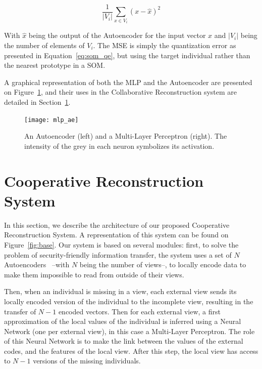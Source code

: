 		\begin{equation}
            \frac{1}{|V_i|}\sum_{x \in V_i}{(x - \hat{x})}^2
		\end{equation}
		
        With $\hat{x}$ being the output of the Autoencoder for the input vector $x$ and $|V_i|$ being the number of elements of $V_i$. The MSE is simply the quantization error as presented in Equation~\ref{eq:som_qe}, but using the target individual rather than the nearest prototype in a SOM.\@

    A graphical representation of both the MLP and the Autoencoder are presented on Figure~\ref{fig:mlp_ae}, and their uses in the Collaborative Reconstruction system are detailed in Section~\ref{sec:crs}.

    \begin{figure}[h]
        \centering
        \texttt{[image: mlp\_ae]}
        \caption{An Autoencoder (left) and a Multi-Layer Perceptron (right). The intensity of the grey in each neuron symbolizes its activation.}
\label{fig:mlp_ae}
    \end{figure}
    
	\section{Cooperative Reconstruction System}
\label{sec:crs}
	
In this section, we describe the architecture of our proposed Cooperative Reconstruction System. A representation of this system can be found on Figure~\ref{fig:base}. Our system is based on several modules: first, to solve the problem of security-friendly information transfer, the system uses a set of $N$ Autoencoders~\cite{hinton2006reducing} --with $N$ being the number of views--, to locally encode data to make them impossible to read from outside of their views.
	
Then, when an individual is missing in a view, each external view sends its locally encoded version of the individual to the incomplete view, resulting in the transfer of $N-1$ encoded vectors. Then for each external view, a first approximation of the local values of the individual is inferred using a Neural Network (one per external view), in this case a Multi-Layer Perceptron. The role of this Neural Network is to make the link between the values of the external codes, and the features of the local view. After this step, the local view has access to $N-1$ versions of the missing individuals.
	
